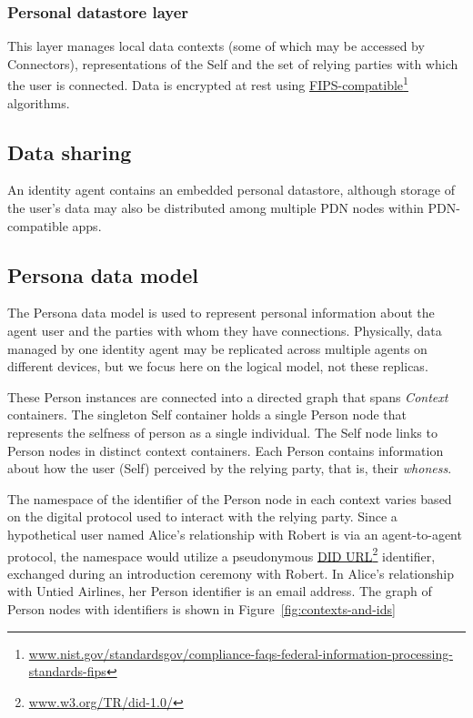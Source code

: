\documentclass[11pt, oneside]{article}   	%
\newcommand{\hyperfootnote}[1][]{\def\ArgI{{#1}}\hyperfootnoteRelay}
\newcommand\hyperfootnoteRelay[2][]{\href{#1#2}{\ArgI}\footnote{\href{#1#2}{#2}}}
\begin{document}
\subsubsection{Personal datastore layer}

This layer manages local data contexts (some of which may be accessed by Connectors), representations of the Self and the set of relying parties with which the user is connected. Data is encrypted at rest using \hyperfootnote[FIPS-compatible][https://]{www.nist.gov/standardsgov/compliance-faqs-federal-information-processing-standards-fips} algorithms. 

\subsection{Data sharing}

An identity agent contains an embedded personal datastore, although storage of the user's data may also be distributed among multiple PDN nodes within PDN-compatible apps. 

\subsection{Persona data model}\label{data_model_subsection} 

The Persona data model is used to represent personal information about the agent user and the parties with whom they have connections. Physically, data managed by one identity agent may be replicated across multiple agents on different devices, but we focus here on the logical model, not these replicas. 

These Person instances are connected into a directed graph that spans \emph{Context} containers. The singleton Self container holds a single Person node that represents the selfness of person as a single individual. The Self node links to Person nodes in distinct context containers. Each Person contains information about how the user (Self) perceived by the relying party, that is, their \emph{whoness}. 

The namespace of the identifier of the Person node in each context varies based on the digital protocol used to interact with the relying party. Since a hypothetical user named Alice's relationship with Robert is via an agent-to-agent protocol, the namespace would utilize a pseudonymous \hyperfootnote[DID URL][https://]{www.w3.org/TR/did-1.0/} identifier, exchanged during an introduction ceremony with Robert. In Alice's relationship with Untied Airlines, her Person identifier is an email address. The graph of Person nodes with identifiers is shown in Figure~\ref{fig:contexts-and-ids}
\end{document}
